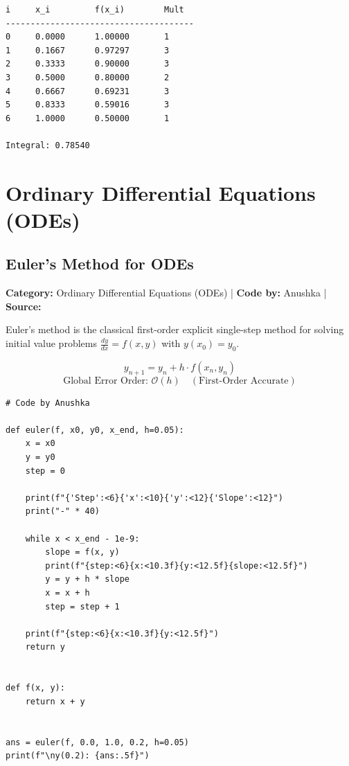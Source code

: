 \documentclass[10pt,a4paper]{report}
\begin{document}
\begin{tcolorbox}[colback=termbg,colframe=primary,title=\textbf{Program Execution Output \& Convergence Table},boxrule=1pt,arc=2mm]
\begin{lstlisting}[style=terminal_output]
i     x_i         f(x_i)        Mult  
--------------------------------------
0     0.0000      1.00000       1     
1     0.1667      0.97297       3     
2     0.3333      0.90000       3     
3     0.5000      0.80000       2     
4     0.6667      0.69231       3     
5     0.8333      0.59016       3     
6     1.0000      0.50000       1     

Integral: 0.78540
\end{lstlisting}
\end{tcolorbox}

\newpage

\chapter{Ordinary Differential Equations (ODEs)}

\section{Euler's Method for ODEs}
\textbf{Category:} \textcolor{secondary}{Ordinary Differential Equations (ODEs)} \quad | \quad \textbf{Code by:} \textcolor{secondary}{Anushka} \quad | \quad \textbf{Source:} \texttt{}

Euler's method is the classical first-order explicit single-step method for solving initial value problems $\frac{dy}{dx} = f(x, y)$ with $y(x_0) = y_0$.

\begin{tcolorbox}[colback=theorybg,colframe=theoryframe,title=\textbf{Mathematical Theory \& Formulation},boxrule=1pt,arc=2mm]
\[
y_{n+1} = y_n + h \cdot f(x_n, y_n)
\]
\[
\text{Global Error Order: } \mathcal{O}(h) \quad (\text{First-Order Accurate})
\]
\end{tcolorbox}

\begin{tcolorbox}[colback=codebg,colframe=secondary,title=\textbf{Python Implementation (Step-by-Step Loops \& Pure Functions)},boxrule=1pt,arc=2mm]
\begin{lstlisting}[style=python_detailed]
# Code by Anushka

def euler(f, x0, y0, x_end, h=0.05):
    x = x0
    y = y0
    step = 0

    print(f"{'Step':<6}{'x':<10}{'y':<12}{'Slope':<12}")
    print("-" * 40)

    while x < x_end - 1e-9:
        slope = f(x, y)
        print(f"{step:<6}{x:<10.3f}{y:<12.5f}{slope:<12.5f}")
        y = y + h * slope
        x = x + h
        step = step + 1

    print(f"{step:<6}{x:<10.3f}{y:<12.5f}")
    return y


def f(x, y):
    return x + y


ans = euler(f, 0.0, 1.0, 0.2, h=0.05)
print(f"\ny(0.2): {ans:.5f}")

\end{lstlisting}
\end{tcolorbox}
\end{document}
